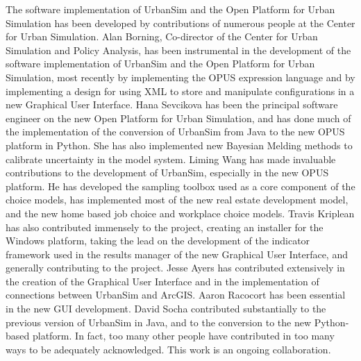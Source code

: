 The software implementation of UrbanSim and the Open Platform for Urban 
Simulation has been developed by contributions of numerous people at the 
Center for Urban Simulation.  Alan Borning, Co-director of the Center 
for Urban Simulation and Policy Analysis, has been instrumental in the 
development of the software implementation of UrbanSim and the Open 
Platform for Urban Simulation, most recently by implementing the OPUS
 expression language and by implementing
a design for using XML to store and manipulate configurations in a new 
Graphical User Interface.  Hana Sevcikova has been the principal software 
engineer
on the new Open Platform for Urban Simulation, and has done much of the 
implementation of the conversion of UrbanSim from Java to the new OPUS 
platform in Python.  She has also implemented new Bayesian Melding methods 
to calibrate uncertainty in the model system.  Liming Wang has made invaluable 
contributions to the development of UrbanSim, especially in the new OPUS 
platform.  He has developed the sampling toolbox used as a core component
of the choice models, has implemented most of the new real estate development
 model, and the new home based job choice and workplace choice models.
Travis Kriplean has also contributed immensely to the project, creating 
an installer for the Windows platform, taking the lead on the development 
of the
indicator framework used in the results manager of the new Graphical User
 Interface, and generally contributing to the project.  Jesse Ayers has 
contributed
extensively in the creation of the Graphical User Interface and in the 
implementation of connections between UrbanSim and ArcGIS.  Aaron Racocort 
has been essential in the new GUI development.  David Socha contributed
substantially to the previous version of UrbanSim in Java, and to the 
conversion to the new Python-based platform.  In fact, too many other 
people have contributed in too many ways to be adequately acknowledged.  
This work is an ongoing collaboration.


